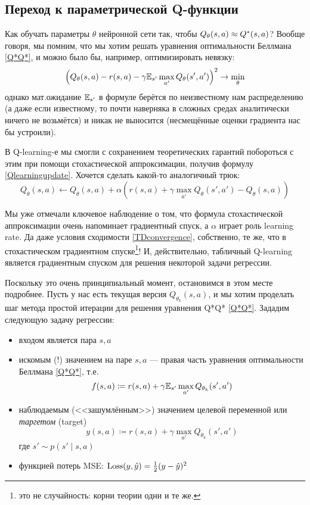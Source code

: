 \subsection{Переход к параметрической Q-функции}\label{toregression}

Как обучать параметры $\theta$ нейронной сети так, чтобы $Q_{\theta}(s, a) \HM \approx Q^*(s, a)$? Вообще говоря, мы помним, что мы хотим решать уравнения оптимальности Беллмана \eqref{Q*Q*}, и можно было бы, например, оптимизировать невязку:
$$\left( Q_{\theta}(s, a) - r(s, a) - \gamma \mathbb{E}_{s'} \max_{a'} Q_{\theta}(s', a') \right)^2 \to \min_{\theta}$$
однако мат.ожидание $\mathbb{E}_{s'}$ в формуле берётся по неизвестному нам распределению (а даже если известному, то почти наверняка в сложных средах аналитически ничего не возьмётся) и никак не выносится (несмещённые оценки градиента нас бы устроили).

В Q-learning-е мы смогли с сохранением теоретических гарантий побороться с этим при помощи стохастической аппроксимации, получив формулу \eqref{Qlearningupdate}. Хочется сделать какой-то аналогичный трюк:
$$Q_{\theta}(s, a) \leftarrow Q_{\theta}(s, a) + \alpha\left( r(s, a) + \gamma \max_{a'} Q_{\theta}(s', a') - Q_{\theta}(s, a) \right)$$

Мы уже отмечали ключевое наблюдение о том, что формула стохастической аппроксимации очень напоминает градиентный спуск, а $\alpha$ играет роль learning rate. Да даже условия сходимости \ref{TDconvergence}, собственно, те же, что в стохастическом градиентном спуске\footnote{это не случайность: корни теории одни и те же.}! И, действительно, табличный Q-learning является градиентным спуском для решения некоторой задачи регрессии.

Поскольку это очень принципиальный момент, остановимся в этом месте подробнее. Пусть у нас есть текущая версия $Q_{\theta_k}(s, a)$, и мы хотим проделать шаг метода простой итерации для решения уравнения Q*Q* \eqref{Q*Q*}. Зададим следующую задачу регрессии:
\begin{itemize}
\item входом является пара $s, a$
\item искомым (!) значением на паре $s, a$ --- правая часть уравнения оптимальности Беллмана \eqref{Q*Q*}, т.е.
$$f(s, a) \coloneqq r(s, a) + \gamma \mathbb{E}_{s'} \max_{a'} Q_{\theta_k}(s', a') $$
\item наблюдаемым (<<зашумлённым>>) значением целевой переменной или \emph{таргетом} (target)
\begin{equation}\label{guess}
y(s, a) \coloneqq r(s, a) + \gamma \max_{a'} Q_{\theta_k}(s', a')
\end{equation}
где $s' \sim p(s' \mid s, a)$
\item функцией потерь MSE:
$\operatorname{Loss}(y, \hat{y}) = \frac{1}{2}(y - \hat{y})^2$
\end{itemize}


